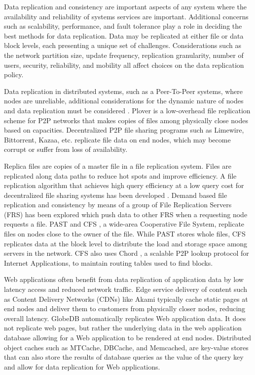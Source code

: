 Data replication and consistency are important aspects of any system where the availability and reliability of systems services are important.
Additional concerns such as scalability, performance, and fault tolerance play a role in deciding the best methods for data replication.
Data may be replicated at either file or data block levels, each presenting a unique set of challenges.
Considerations such as the network partition size, update frequency, replication granularity, number of users, security, reliability, and mobility all affect choices on the data replication policy.

Data replication in distributed systems, such as a Peer-To-Peer systems, where nodes are unreliable, additional considerations for the dynamic nature of nodes and data replication must be considered \cite{DRP}. 
Plover \cite{PLF} is a low-overhead file replication scheme for P2P networks that makes copies of files among physically close nodes based on capacities.
Decentralized P2P file sharing programs such as Limewire, Bittorrent, Kazaa, etc. replicate file data on end nodes, which may become corrupt or suffer from loss of availability.

Replica files are copies of a master file in a file replication system.
Files are replicated along data paths to reduce hot spots and improve efficiency.  A file replication algorithm that achieves high query efficiency at a low query cost for decentralized file sharing systems has been developed \cite{EAD}.
Demand based file replication and consistency by means of a group of File Replication Servers (FRS) \cite{DBF} has been explored which push data to other FRS when a requesting node requests a file.
PAST \cite{PAST} and CFS \cite{CFS}, a wide-area Cooperative File System, replicate files on nodes close to the owner of the file.  While PAST stores whole files, CFS replicates data at the block level to distribute the load and storage space among servers in the network.
CFS also uses Chord \cite{chord}, a scalable P2P lookup protocol for Internet Applications, to maintain routing tables used to find blocks.

Web applications often benefit from data replication of application data by low latency access and reduced network traffic.
Edge service delivery of content such as Content Delivery Networks (CDNs) like Akami typically cache static pages at end nodes and deliver them to customers from physically closer nodes, reducing overall latency.
GlobeDB \cite{GDB} automatically replicates Web application data.  It does not replicate web pages, but rather the underlying data in the web application database allowing for a Web application to be rendered at end nodes.
Distributed object caches such as MTCache, DBCache, and Memcached, are key-value stores that can also store the results of database queries as the value of the query key and allow for data replication for Web applications.
 
